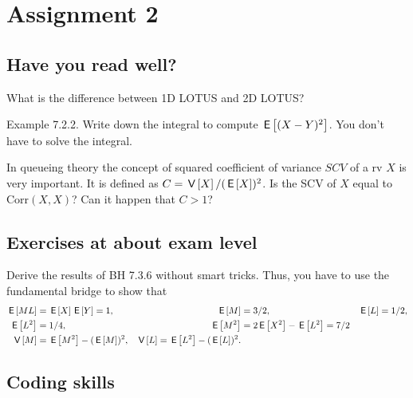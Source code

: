 \documentclass[assignments]{subfiles}
\begin{document}
\section{Assignment 2}


\subsection{Have you read well?}


\begin{exercise}
What is the difference between 1D LOTUS and 2D LOTUS?
\end{exercise}

\begin{exercise}
Example 7.2.2. Write down the integral to compute $\,\mathsf{E}\left[(X-Y)^{2}\right]$. You don't have to solve the integral.
\end{exercise}

\begin{exercise}
In queueing theory  the concept of squared coefficient of variance $SCV$ of a rv $X$ is very important. It is defined as $C = \,\mathsf{V}\left[X\right]/(\,\mathsf{E}\left[X\right])^{2}$. Is the SCV of $X$ equal to $\text{Corr}(X,X)$? Can it happen that $C>1$?
\end{exercise}


\subsection{Exercises at about exam level}
\label{sec:exercises-at-about}

\begin{exercise}
Derive the results of BH 7.3.6 without smart tricks. Thus, you have to use the fundamental bridge to show that 
\begin{align*}
\,\mathsf{E}\left[M L\right] &= \,\mathsf{E}\left[X\right] \,\mathsf{E}\left[Y\right] = 1, & \,\mathsf{E}\left[M\right] &= 3/2, & \,\mathsf{E}\left[L\right] &= 1/2, \\
\,\mathsf{E}\left[L^{2}\right] &=  1/4, & \,\mathsf{E}\left[M^{2}\right] &= 2\,\mathsf{E}\left[X^{2}\right] - \,\mathsf{E}\left[L^{2}\right] = 7/2 \\ 
\,\mathsf{V}\left[M\right]&=\,\mathsf{E}\left[M^2\right] - (\,\mathsf{E}\left[M\right])^{2}, & \,\mathsf{V}\left[L\right] = \,\mathsf{E}\left[L^2\right]-(\,\mathsf{E}\left[L\right])^2.
\end{align*}
\end{exercise}


\subsection{Coding skills}
\label{sec:progr-assignm}
\end{document}
